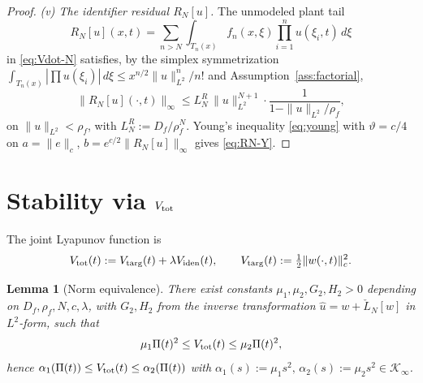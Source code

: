 \documentclass[journal,twoside,web]{ieeecolor}
\newtheorem{lemma}{Lemma}
\begin{document}
\begin{proof}
\emph{(v) The identifier residual $R_N[u]$.} The unmodeled plant tail
\begin{equation}\label{eq:RN-explicit}
R_N[u](x,t)=\sum_{n>N}\int_{T_n(x)}f_n(x,\xi)\prod_{i=1}^n u(\xi_i,t)\,d\xi
\end{equation}
in \eqref{eq:Vdot-N} satisfies, by the simplex symmetrization $\int_{T_n(x)}|\prod u(\xi_i)|\,d\xi\le x^{n/2}\|u\|^n_{L^2}/n!$ and Assumption~\ref{ass:factorial},
\begin{equation}\label{eq:RN-bound}
\|R_N[u](\cdot,t)\|_\infty\le L^R_N\,\|u\|_{L^2}^{N+1}\cdot\frac{1}{1-\|u\|_{L^2}/\rho_f},
\end{equation}
on $\|u\|_{L^2}<\rho_f$, with $L^R_N:=D_f/\rho_f^N$. Young's inequality \eqref{eq:young} with $\vartheta=c/4$ on $a=\|e\|_c$, $b=e^{c/2}\|R_N[u]\|_\infty$ gives \eqref{eq:RN-Y}.
\end{proof}

\section{Stability via $V_{\rm tot}$}\label{sec:proof-Udot}

The joint Lyapunov function is
\begin{equation}\label{eq:U-Lyap-def}
V_{\rm tot}(t):=V_{\rm targ}(t)+\lambda V_{\rm iden}(t),\qquad V_{\rm targ}(t):=\tfrac12\|w(\cdot,t)\|_c^2.
\end{equation}

\begin{lemma}[Norm equivalence]\label{lem:norm-equiv}
There exist constants $\mu_1,\mu_2,G_2,H_2>0$ depending on $D_f,\rho_f,N,c,\lambda$, with $G_2,H_2$ from the inverse transformation $\hat u=w+\check L_N[w]$ in $L^2$-form, such that
\begin{equation}\label{eq:norm-equiv-bd}
\mu_1\Pi(t)^2\le V_{\rm tot}(t)\le\mu_2\Pi(t)^2,
\end{equation}
hence $\alpha_1(\Pi(t))\le V_{\rm tot}(t)\le\alpha_2(\Pi(t))$ with $\alpha_1(s):=\mu_1 s^2,\,\alpha_2(s):=\mu_2 s^2\in\mathcal K_\infty$.
\end{lemma}
\end{document}
